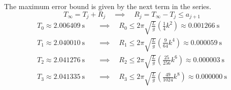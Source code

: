 \documentclass[12pt]{article}
\begin{document}




The maximum error bound is given by the next term in the series.
\[T_\infty = T_j + R_j \quad \implies \quad R_j = T_\infty - T_j \leq a_{j+1} \]
\begin{align*}
  T_0 \approx \SI{2.006409}{\second} \quad &\implies \quad R_0 \leq 2\pi \sqrt{\frac{L}{g}} \left(\frac{1}{4}k^2\right) \approx \boxed{\SI{0.001266}{\second}} \\
  T_1 \approx \SI{2.040010}{\second} \quad &\implies \quad R_1 \leq 2\pi \sqrt{\frac{L}{g}} \left(\frac{9}{64}k^4\right) \approx \boxed{\SI{0.000059}{\second}} \\
  T_2 \approx \SI{2.041276}{\second} \quad &\implies \quad R_2 \leq 2\pi \sqrt{\frac{L}{g}} \left(\frac{25}{256}k^6\right) \approx \boxed{\SI{0.000003}{\second}} \\
  T_3 \approx \SI{2.041335}{\second} \quad &\implies \quad R_3 \leq 2\pi \sqrt{\frac{L}{g}} \left(\frac{49}{1024}k^8\right) \approx \boxed{\SI{0.000000}{\second}} \\
\end{align*}
\end{document}
